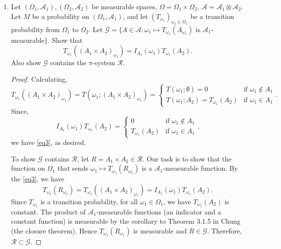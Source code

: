 \documentclass[letterpaper, 12pt]{article}
\newcommand{\cA}{\mathcal{A}}
\newcommand{\sG}{\mathscr{G}}
\newcommand{\sP}{\mathscr{P}}
\newcommand{\cR}{\mathcal{R}}
\begin{document}
\begin{enumerate}
\begin{proof}
By hypothesis, $\sP \subset \sG$, whence by the $\pi$-$\lambda$ theorem we have $\sigma(\sP) = \cA_2 \subset \sG$. 
By the definition of $\sG$, it is clear $\sG \subset \cA_2$. Therefore $\sG = \cA_2$, which demonstrates (2). 
\end{proof}
\item
Let $(\Omega_1,\cA_1),(\Omega_2,\cA_2)$ be measurable spaces, $\Omega=\Omega_1\times\Omega_2$, $\cA=\cA_1\otimes\cA_2$. 
Let $M$ be a probability on $(\Omega_1,\cA_1)$, and let $(T_{\omega_1})_{\omega_1\in\Omega_1}$ be a transition probability from $\Omega_1$ to $\Omega_2$. 
Let $\sG = \{ A\in\cA:\omega_1\mapsto T_{\omega_1}(A_{\omega_1})$ is $\cA_1$-measurable$\}$. 
Show that
\begin{equation} 
\label{eq3}
T_{\omega_1}((A_1\times A_2)_{\omega_1}) = I_{A_1}(\omega_1)T_{\omega_1}(A_2).
\end{equation}
Also show $\sG$ contains the $\pi$-system $\cR$.
\begin{proof}
Calculating, 
\[
T_{\omega_1}((A_1 \times A_2)_{\omega_1})
= T(\omega_1; (A_1 \times A_2)_{\omega_1})
= 
\begin{cases}
T(\omega_1; \emptyset) = 0 & \text{if $\omega_1 \notin A_1$} \\
T(\omega_1; A_2) = T_{\omega_1}(A_2) & \text{if $\omega_1 \in A_1$}
\end{cases}
\text{.}
\]
Since,
\[
I_{A_1}(\omega_1) T_{\omega_1}(A_2)
=
\begin{cases}
0 & \text{if $\omega_1 \notin A_1$} \\
T_{\omega_1}(A_2) & \text{if $\omega_1 \in A_1$}
\end{cases}
\text{,}
\]
we have \eqref{eq3}, as desired.

To show $\sG$ contains $\cR$, let $R = A_1 \times A_2 \in \cR$. Our task is to show that the function on $\Omega_1$ that sends $\omega_1\mapsto T_{\omega_1}(R_{\omega_1})$ is a $\cA_1$-measurable function. By the \eqref{eq3}, we have
\[
T_{\omega_1}(R_{\omega_1}) = T_{\omega_1}((A_1\times A_2)_{\omega_1}) = I_{A_1}(\omega_1)T_{\omega_1}(A_2).
\]
Since $T_{\omega_1}$ is a transition probability, for all $\omega_1 \in \Omega_1$, we have $T_{\omega_1}(A_2)$ is constant. 
The product of $\cA_1$-measurable functions (an indicator and a constant function) is measurable by the corollary to Theorem 3.1.5 in Chung (the closure theorem). Hence $T_{\omega_1}(R_{\omega_1})$ is measurable and $R \in \sG$. Therefore, $\cR \subset \sG$. 
\end{proof}


\end{enumerate}
\end{document}
